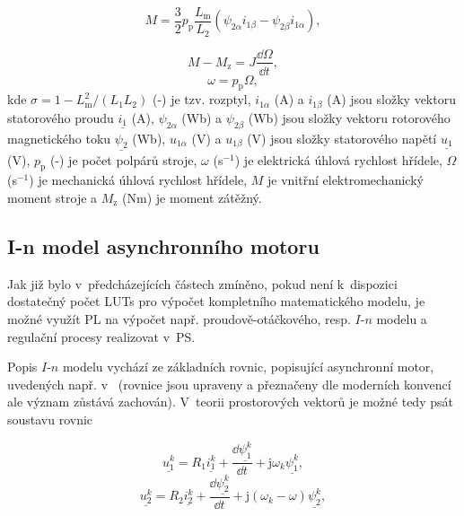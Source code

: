 \documentclass[a4paper, twoside, 11pt]{article}
\begin{document}
\begin{equation}
    M = \frac{3}{2} p_\text{p} \frac{L_\text{m}}{L_2} (\psi_{2\alpha} i_{1\beta} - \psi_{2\beta} i_{1\alpha}),
\end{equation}

\begin{equation}
    M - M_\text{z} = J \frac{\dd{\Omega}}{\dd{t}},
\end{equation}
\begin{equation}
    \omega = p_\text{p} \Omega,
\end{equation}
kde $\sigma = 1 - L_\text{m}^{2}/(L_1 L_2)$ (-) je tzv. rozptyl, $i_{1\alpha}$ (A) a $i_{1\beta}$ (A) jsou složky vektoru statorového proudu $\underline{i_1}$ (A), $\psi_{2\alpha}$ (Wb) a $\psi_{2\beta}$ (Wb) jsou složky vektoru rotorového magnetického toku $\underline{\psi_2}$ (Wb), $u_{1\alpha}$ (V) a $u_{1\beta}$ (V) jsou složky statorového napětí $\underline{u_1}$ (V), $p_\text{p}$ (-) je počet polpárů stroje, $\omega$ (s$^{-1}$) je elektrická úhlová rychlost hřídele, $\Omega$ (s$^{-1}$) je mechanická úhlová rychlost hřídele, $M$ je vnitřní elektromechanický moment stroje a $M_\text{z}$ (Nm) je moment zátěžný.

	\subsection{I-n model asynchronního motoru}
		Jak již bylo v~předcházejících částech zmíněno, pokud není k~dispozici dostatečný počet LUTs pro výpočet kompletního matematického modelu, je možné využít PL na výpočet např. proudově-otáčkového, resp. $I$-$n$ modelu a regulační procesy realizovat v~PS.\par
		Popis $I$-$n$ modelu vychází ze základních rovnic, popisující asynchronní motor, uvedených např. v~\cite{kobrle-elektricke-pohony} (rovnice jsou upraveny a přeznačeny dle moderních konvencí ale význam zůstává zachován). V~teorii prostorových vektorů je možné tedy psát soustavu rovnic

		\begin{equation}
			\underline{u_{1}^{k}} = R_1 \underline{i_{1}^{k}} + \frac{\dd{\underline{\psi_1^{k}}}}{\dd{t}} + \text{j} \omega_k \underline{\psi_1^{k}},
		\end{equation}
		\begin{equation}
			\underline{u_{2}^{k}} = R_2 \underline{i_{2}^{k}} + \frac{\dd{\underline{\psi_2^{k}}}}{\dd{t}} + \text{j} (\omega_k - \omega) \underline{\psi_2^{k}},
		\end{equation}
	
\end{document}
